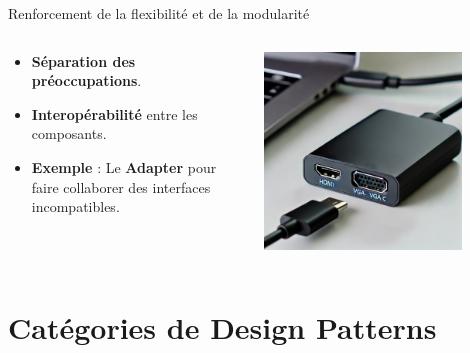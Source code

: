 \documentclass[aspectratio=169]{beamer}
\begin{document}
\begin{frame}{Renforcement de la flexibilité et de la modularité}
    \begin{columns}
        \begin{column}{0.6\textwidth}
    \begin{itemize}
        \item \textbf{Séparation des préoccupations}.
        \item \textbf{Interopérabilité} entre les composants.
        \pause
        \item \textbf{Exemple} : Le \textbf{Adapter} pour faire collaborer des interfaces incompatibles.
    \end{itemize}
\end{column}
\begin{column}{0.4\textwidth}
    \begin{center}
        \includegraphics[width=0.8\textwidth]{pic/adapter_pattern.png}
    \end{center}
\end{column}
\end{columns}
\end{frame}

\section{Catégories de Design Patterns}
\end{document}
